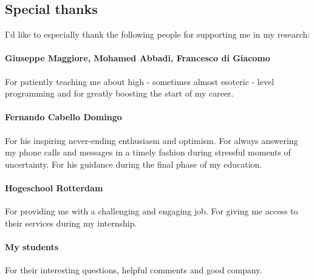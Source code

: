 \documentclass{article}
\begin{document}
\subsection{Special thanks}
I'd like to especially thank the following people for supporting me in my research:

\paragraph{Giuseppe Maggiore, Mohamed Abbadi, Francesco di Giacomo}
For patiently teaching me about high - sometimes almost esoteric - level programming and for greatly boosting the start of my
career.

\paragraph{Fernando Cabello Domingo}
For his inspiring never-ending enthusiasm and optimism. For always answering my phone calls and messages in a timely fashion
during stressful moments of uncertainty. For his guidance during the final phase of my education.

\paragraph{Hogeschool Rotterdam}
For providing me with a challenging and engaging job. For giving me access to their services during my internship.

\paragraph{My students}
For their interesting questions, helpful comments and good company.


\newpage


\printbibliography[heading=bibintoc]
\end{document}

